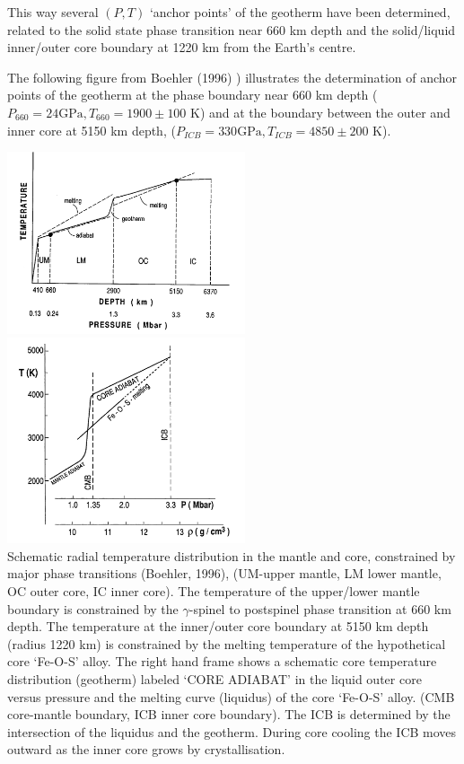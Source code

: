 This way several $(P,T)$ `anchor points' of the geotherm have
been determined, related to the solid state phase transition near 
660 km depth and the solid/liquid inner/outer core boundary at 
1220 km from the Earth's centre.

The following figure from Boehler (1996) \cite{boeh96})
illustrates the determination of anchor points of the geotherm at the 
phase boundary near 660 km depth
($P_{660}=24 \mathrm{GPa}, T_{660}=1900 \pm 100$ K)
and at the boundary between the outer and inner core at 5150 km depth,
($P_{ICB}=330 \mathrm{GPa}, T_{ICB}=4850 \pm 200$ K).

\begin{center}
\includegraphics[width=7cm]{images/gravity/boehler_annrev96_fig1}
\includegraphics[width=7cm]{images/gravity/boehler_annrev96_fig6}\\
{\captionfont
Schematic radial temperature distribution in the mantle
           and core, constrained by major phase transitions (Boehler, 1996),
           (UM-upper mantle, LM lower mantle, OC outer core, IC inner core).
           The temperature of the upper/lower mantle boundary is 
           constrained by the $\gamma$-spinel to postspinel phase
           transition at 660 km depth.
           The temperature at the inner/outer core boundary at 
           5150 km depth (radius 1220 km) is constrained 
           by the melting temperature of the hypothetical
           core `Fe-O-S' alloy.
           The right hand frame shows a schematic core temperature 
           distribution (geotherm) labeled `CORE ADIABAT' in the 
           liquid outer core
           versus pressure and the melting curve (liquidus) of the core 
            `Fe-O-S' alloy.
           (CMB core-mantle boundary, ICB inner core boundary).
           The ICB is determined by the intersection of the liquidus
           and the geotherm.
           During core cooling the ICB moves outward as the inner core
           grows by crystallisation.}
\end{center}

